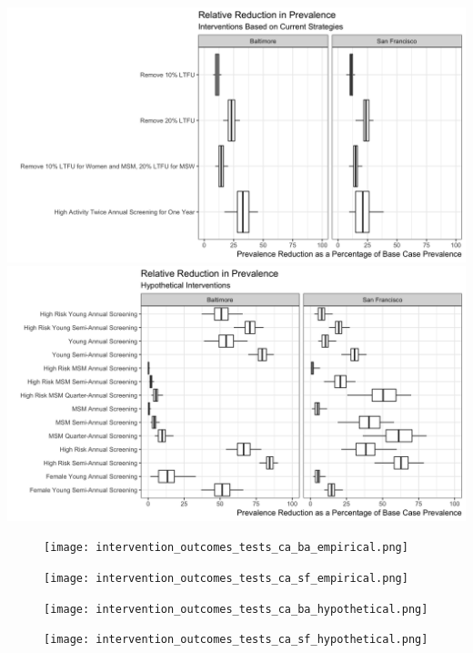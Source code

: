 \documentclass[]{article}
\begin{document}
\includegraphics{prevalence_ratio_in_last_year_empirical.png}
\includegraphics{prevalence_ratio_in_last_year_hypothetical.png}

\begin{figure}
\centering
\texttt{[image: intervention\_outcomes\_tests\_ca\_ba\_empirical.png]}
\caption{}
\end{figure}

\begin{figure}
\centering
\texttt{[image: intervention\_outcomes\_tests\_ca\_sf\_empirical.png]}
\caption{}
\end{figure}

\begin{figure}
\centering
\texttt{[image: intervention\_outcomes\_tests\_ca\_ba\_hypothetical.png]}
\caption{}
\end{figure}

\begin{figure}
\centering
\texttt{[image: intervention\_outcomes\_tests\_ca\_sf\_hypothetical.png]}
\caption{}
\end{figure}
\end{document}

